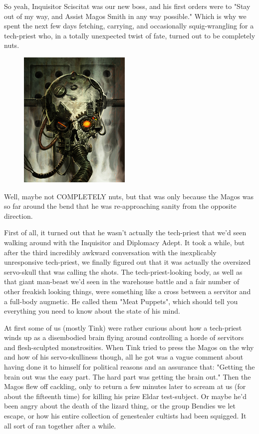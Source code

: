 So yeah, Inquisitor Sciscitat was our new boss, and his first orders were to "Stay out of my way, and Assist Magos Smith in any way possible." Which is why we spent the next few days fetching, carrying, and occasionally squig-wrangling for a tech-priest who, in a totally unexpected twist of fate, turned out to be completely nuts.

\begin{figure}
	\begin{center}
		\includegraphics[width=\figwidth]{pics/17/8.png}
	\end{center}
\end{figure}
Well, maybe not COMPLETELY nuts, but that was only because the Magos was so far around the bend that he was re-approaching sanity from the opposite direction. 


First of all, it turned out that he wasn't actually the tech-priest that we'd seen walking around with the Inquisitor and Diplomacy Adept. 
It took a while, but after the third incredibly awkward conversation with the inexplicably unresponsive tech-priest, we finally figured out that it was actually the oversized servo-skull that was calling the shots. 
The tech-priest-looking body, as well as that giant man-beast we'd seen in the warehouse battle and a fair number of other freakish looking things, were something like a cross between a servitor and a full-body augmetic. 
He called them "Meat Puppets", which should tell you everything you need to know about the state of his mind.

At first some of us (mostly Tink) were rather curious about how a tech-priest winds up as a disembodied brain flying around controlling a horde of servitors and flesh-sculpted monstrosities. 
When Tink tried to press the Magos on the why and how of his servo-skulliness though, all he got was a vague comment about having done it to himself for political reasons and an assurance that: 
"Getting the brain out was the easy part. 
The hard part was getting the brain out." Then the Magos flew off cackling, only to return a few minutes later to scream at us (for about the fifteenth time) for killing his prize Eldar test-subject. 
Or maybe he'd been angry about the death of the lizard thing, or the group Bendies we let escape, or how his entire collection of genestealer cultists had been squigged. 
It all sort of ran together after a while.

